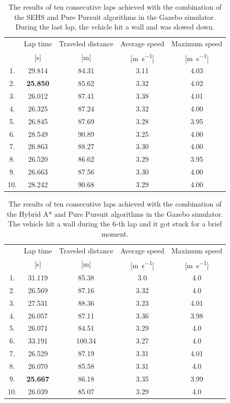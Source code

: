\begin{table}
	\centering
	\begin{tabular}{c c c c c}
		\toprule
		& Lap time & Traveled distance  & Average speed & Maximum speed             \\
		& [\si{\second}] & [\si{\meter}]      & [\si{\meter\per\second}]  & [\si{\meter\per\second}]  \\
		\midrule
		1. & 29.814 & 84.31 & 3.11 & 4.03 \\
		2. & \bfseries 25.850 & 85.62 & 3.32 & 4.02 \\
		3. & 26.012 & 87.41 & 3.38 & 4.01 \\
		4. & 26.325 & 87.24 & 3.32 & 4.00 \\
		5. & 26.845 & 87.69 & 3.28 & 3.95 \\
		6. & 28.549 & 90.89 & 3.25 & 4.00 \\
		7. & 26.863 & 88.27 & 3.30 & 4.00 \\
		8. & 26.520 & 86.62 & 3.29 & 3.95 \\
		9. & 26.663 & 87.56 & 3.30 & 4.00 \\
		10. & 28.242 & 90.68 & 3.29 & 4.00 \\
		\bottomrule
	\end{tabular}
	\caption{The results of ten consecutive laps achieved with the combination of the SEHS and Pure Pursuit algorithms in the Gazebo simulator. During the last lap, the vehicle hit a wall and was slowed down.}
	\label{tbl:pure-pursuit-sehs}
\end{table}

\begin{table}
	\centering
	\begin{tabular}{c c c c c}
		\toprule
		& Lap time & Traveled distance  & Average speed & Maximum speed             \\
		& [\si{\second}] & [\si{\meter}]      & [\si{\meter\per\second}]  & [\si{\meter\per\second}]  \\
		\midrule
		1. & 31.119 & 85.38 & 3.0 & 4.0 \\
		2. & 26.569 & 87.16 & 3.32 & 4.0 \\
		3. & 27.531 & 88.36 & 3.23 & 4.01 \\
		4. & 26.057 & 87.11 & 3.36 & 3.98 \\
		5. & 26.071 & 84.51 & 3.29 & 4.0 \\
		6. & 33.191 & 100.34 & 3.27 & 4.0 \\
		7. & 26.529 & 87.19 & 3.31 & 4.01 \\
		8. & 26.070 & 85.58 & 3.31 & 4.0 \\
		9. & \bfseries 25.667 & 86.18 & 3.35 & 3.99 \\
		10. & 26.039 & 85.07 & 3.29 & 4.0 \\
		\bottomrule
	\end{tabular}
	\caption{The results of ten consecutive laps achieved with the combination of the Hybrid A* and Pure Pursuit algorithms in the Gazebo simulator. The vehicle hit a wall during the 6-th lap and it got stuck for a brief moment.}
	\label{tbl:pure-pursuit-hybrid-astar}
\end{table}

